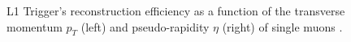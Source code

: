    				\begin{figure}[h!]
    					\centering
    					\caption{L1 Trigger's reconstruction efficiency as a function of the transverse momentum $ p_T $ (left) and pseudo-rapidity $ \eta $ (right) of single muons \Cite{CMS_L1_Efficiency}.}
    					\label{fig:trigger_system_and_reconstruction_algorithms__l1_cut}
    				\end{figure}

